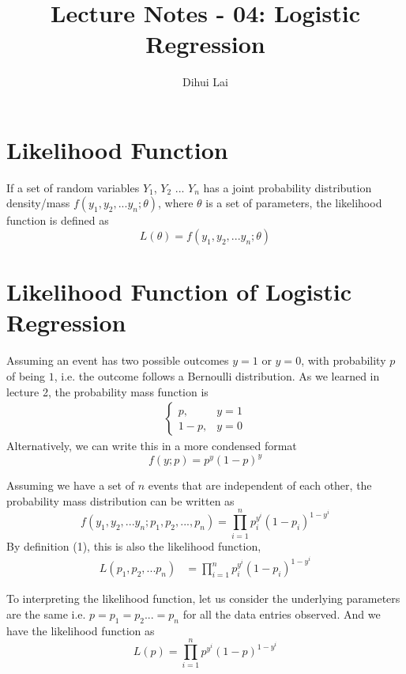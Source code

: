 \documentclass[12pt, oneside]{article}
\title{Lecture Notes - 04: Logistic Regression}
\author{Dihui Lai}
\begin{document}
\maketitle
\tableofcontents

\vspace{.25in}

\section{Likelihood Function}

If a set of random variables $Y_1$, $Y_2$ ... $Y_n$ has a joint probability distribution density/mass $f(y_1, y_2, ...y_n;\theta)$, where $\theta$ is a set of parameters, the likelihood function is defined as 
\begin{equation}
L(\theta)=f(y_1, y_2, ...y_n; \theta)
\end{equation}

\section{Likelihood Function of Logistic Regression}

Assuming an event has two possible outcomes $y=1$ or $y=0$, with probability $p$ of being $1$, i.e. the outcome follows a Bernoulli distribution. As we learned in lecture 2, the probability mass function is 
\begin{align*}
\begin{cases}
p, &y=1\\
1-p,  &y=0
\end{cases}
\end{align*}
Alternatively, we can write this in a more condensed format
\begin{equation}
f(y;p)=p^y(1-p)^y
\end{equation}

Assuming we have a set of $n$ events that are independent of each other, the probability mass distribution can be written as 
$$f(y_1, y_2, ...y_n; p_1, p_2, ..., p_n)=\prod_{i=1}^{n}p_{i}^{y^i}(1-p_{i})^{1-y^{i}}$$
By definition (1), this is also the likelihood function,
\begin{align*}
L(p_1, p_2,...p_n)&={\prod_{i=1}^{n}p_{i}^{y^i}(1-p_{i})^{1-y^{i}}}
\end{align*}


To interpreting the likelihood function, let us consider the underlying parameters are the same i.e. $p=p_1=p_2...=p_n$ for all the data entries observed. And we have the likelihood function as
$$L(p)={\prod_{i=1}^{n}p^{y^i}(1-p)^{1-y^{i}}}$$
\end{document}
